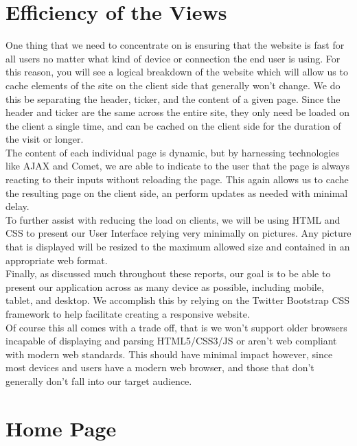 \section{Efficiency of the Views}

One thing that we need to concentrate on is ensuring that the website is fast
for all users no matter what kind of device or connection the end user is using.
For this reason, you will see a logical breakdown of the website which will
allow us to cache elements of the site on the client side that generally won't
change.  We do this be separating the header, ticker, and the content of a given
page.  Since the header and ticker are the same across the entire site, they
only need be loaded on the client a single time, and can be cached on the client
side for the duration of the visit or longer.\\

The content of each individual page is dynamic, but by harnessing technologies
like AJAX\cite{wiki:ajax} and Comet\cite{wiki:comt}, we are able to indicate to
the user that the page
is always reacting to their inputs without reloading the page.  This again
allows us to cache the resulting page on the client side, an perform updates
as needed with minimal delay.\\

To further assist with reducing the load on clients, we will be using
HTML\cite{wiki:html} and CSS\cite{wiki:css} to present our User Interface
relying very minimally on pictures.  Any picture that is displayed will be
resized to the maximum allowed size and contained in an appropriate web format.\\

Finally, as discussed much throughout these reports, our goal is to be able to
present our application across as many device as possible, including mobile,
tablet, and desktop.  We accomplish this by relying on the Twitter
Bootstrap\cite{wiki:boot} CSS framework to help facilitate creating a responsive
website.\\

Of course this all comes with a trade off, that is we won't support older
browsers incapable of displaying and parsing HTML5/CSS3/JS or aren't web
compliant with modern web standards.  This should have minimal impact however,
since most devices and users have a modern web browser, and those that don't
generally don't fall into our target audience.\\

\section{Home Page}

